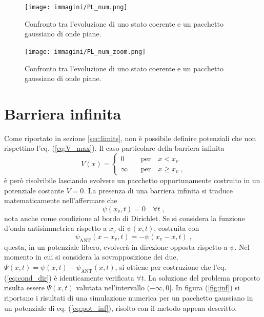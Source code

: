 \begin{figure}
    \centering
    \texttt{[image: immagini/PL\_num.png]}
    \caption{Confronto tra l'evoluzione di uno stato coerente e un pacchetto gaussiano di onde piane.}
    \label{fig:PL_conf}
\end{figure}

\begin{figure}
    \centering
    \texttt{[image: immagini/PL\_num\_zoom.png]}
    \caption{Confronto tra l'evoluzione di uno stato coerente e un pacchetto gaussiano di onde piane.}
    \label{fig:PL_conf_zoom}
\end{figure}

\section{Barriera infinita}
\label{sec:inf}

Come riportato in sezione \ref{sec:limits}, non è possibile definire potenziali che non rispettino l'eq. (\ref{eq:V_max}). Il caso particolare della barriera infinita 
\begin{equation}
    V(x) = 
    \begin{cases}
        0 \quad &\text{per} \quad x < x_v \\
        \infty \quad &\text{per} \quad x \geq x_v \; \text{,}
    \end{cases}
    \label{eq:pot_inf}
\end{equation}
è però risolvibile lasciando evolvere un pacchetto opportunamente costruito in un potenziale costante $V = 0$. La presenza di una barriera infinita si traduce matematicamente nell'affermare che 
\begin{equation}
    \psi(x_v, t) = 0 \quad \forall t \; \text{,}
    \label{eq:cond_dir}
\end{equation}
nota anche come condizione al bordo di Dirichlet. 
Se si considera la funzione d'onda antisimmetrica rispetto a $x_v$ di $\psi(x,t)$, costruita con
\begin{equation}
    \psi_{\text{ANT}}(x -x_v, t) =  - \psi(x_v - x , t) \; \text{,} 
\end{equation}    
questa, in un potenziale libero, evolverà in direzione opposta rispetto a $\psi$. Nel momento in cui si considera la sovrapposizione dei due, $\Psi(x,t) = \psi(x, t) + \psi_{\text{ANT}}(x, t)$, si ottiene per costruzione che l'eq. (\ref{eq:cond_dir}) è identicamente verificata $\forall t$. 
La soluzione del problema proposto risulta essere $\Psi(x,t)$ valutata nel'intervallo $(-\infty, 0]$. In figura (\ref{fig:inf}) si riportano i risultati di una simulazione numerica per un pacchetto gaussiano in un potenziale di eq. (\ref{eq:pot_inf}), risolto con il metodo appena descritto.

